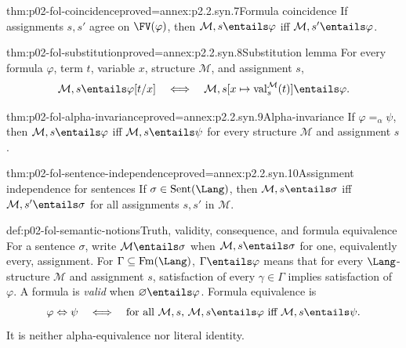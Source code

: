 \begin{hblemma}{thm:p02-fol-coincidence}{proved=annex:p2.2.syn.7}{Formula coincidence}
If assignments \(s,s'\) agree on \(\FV(\varphi)\), then
\(\mathcal M,s\entails\varphi\) iff
\(\mathcal M,s'\entails\varphi\).
\end{hblemma}

\begin{hbtheorem}{thm:p02-fol-substitution}{proved=annex:p2.2.syn.8}{Substitution lemma}
For every formula \(\varphi\), term \(t\), variable \(x\), structure
\(\mathcal M\), and assignment \(s\),
\[
 \mathcal M,s\entails\varphi[t/x]
 \quad\Longleftrightarrow\quad
 \mathcal M,s[x\mapsto\operatorname{val}^{\mathcal M}_s(t)]
 \entails\varphi.
\]
\end{hbtheorem}

\begin{hbcorollary}{thm:p02-fol-alpha-invariance}{proved=annex:p2.2.syn.9}{Alpha-invariance}
If \(\varphi=_{\alpha}\psi\), then
\(\mathcal M,s\entails\varphi\) iff
\(\mathcal M,s\entails\psi\) for every structure \(\mathcal M\) and
assignment \(s\).
\end{hbcorollary}

\begin{hbcorollary}{thm:p02-fol-sentence-independence}{proved=annex:p2.2.syn.10}{Assignment independence for sentences}
If \(\sigma\in\operatorname{Sent}(\Lang)\), then
\(\mathcal M,s\entails\sigma\) iff
\(\mathcal M,s'\entails\sigma\) for all assignments \(s,s'\) in
\(\mathcal M\).
\end{hbcorollary}

\begin{hbdefinition}{def:p02-fol-semantic-notions}{Truth, validity, consequence, and formula equivalence}
For a sentence \(\sigma\), write \(\mathcal M\entails\sigma\) when
\(\mathcal M,s\entails\sigma\) for one, equivalently every, assignment.
For \(\Gamma\subseteq\operatorname{Fm}(\Lang)\),
\(\Gamma\entails\varphi\) means that for every \(\Lang\)-structure
\(\mathcal M\) and assignment \(s\), satisfaction of every
\(\gamma\in\Gamma\) implies satisfaction of \(\varphi\).  A formula is
\emph{valid} when \(\varnothing\entails\varphi\).  Formula equivalence is
\[
 \varphi\Leftrightarrow\psi
 \quad\Longleftrightarrow\quad
 \text{for all \(\mathcal M,s\), }
 \mathcal M,s\entails\varphi\text{ iff }\mathcal M,s\entails\psi.
\]
It is neither alpha-equivalence nor literal identity.
\end{hbdefinition}

